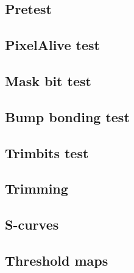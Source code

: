\subsection{Pretest}
\label{ss:pretest}

\subsection{PixelAlive test}
\label{ss:alivetest}

\subsection{Mask bit test}
\label{ss:masktest}

\subsection{Bump bonding test}
\label{ss:bbtest}

\subsection{Trimbits test}
\label{ss:trimbits}

\subsection{Trimming}
\label{ss:trimming}

\subsection{S-curves}
\label{ss:scurves}

\subsection{Threshold maps}
\label{ss:thrmaps}


